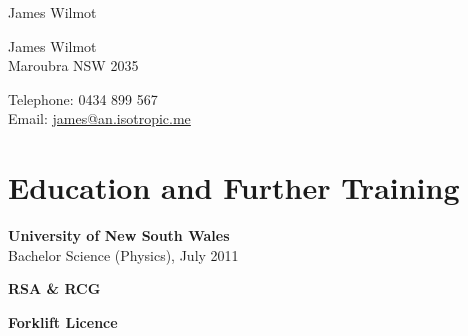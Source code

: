 \documentclass[10pt,a4paper]{article}
\def\name{James Wilmot}
\renewenvironment{itemize}{
\begin{list}{}{
\setlength{\leftmargin}{1.5em}
\setlength{\itemsep}{0.25em}
\setlength{\parskip}{0pt}
\setlength{\parsep}{0.25em}
}
}{
\end{list}
}
\begin{document}
{\huge \name}


\bigskip

\begin{minipage}[t]{0.64\textwidth}
James Wilmot \\
Maroubra NSW 2035
\end{minipage}
\begin{minipage}[t]{0.36\textwidth}
Telephone: 0434 899 567 \\
Email: \href{mailto:james@an.isotropic.me}{james@an.isotropic.me} \\
\end{minipage}

\section*{Education and Further Training}
\begin{itemize}
\item \textbf{University of New South Wales} \\
Bachelor Science (Physics), July 2011

\item \textbf{RSA \& RCG}
\item \textbf{Forklift Licence}
\end{itemize}


\vspace{-0.6cm}
\end{document}
